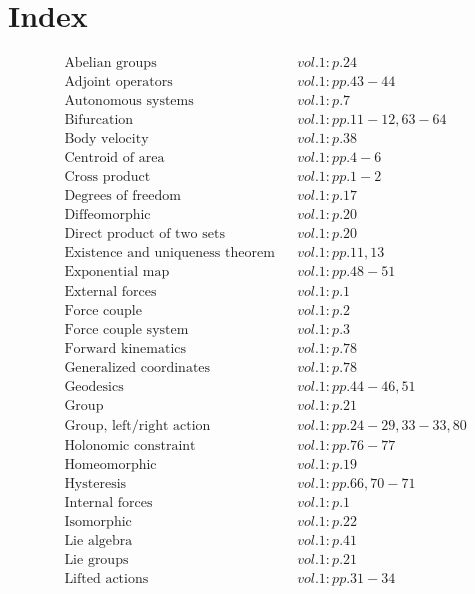 \documentclass[a4paper]{article}
\begin{document}
 
\section*{Index} 
\allowdisplaybreaks 
\begin{align*} 
&\text{Abelian groups} && vol. 1: p. 24\\
&\text{Adjoint operators} && vol. 1: pp. 43-44\\
&\text{Autonomous systems} && vol. 1: p. 7\\
&\text{Bifurcation} && vol. 1: pp. 11-12, 63-64\\
&\text{Body velocity} && vol. 1: p. 38\\
&\text{Centroid of area} && vol. 1: pp. 4-6\\
&\text{Cross product} && vol. 1: pp. 1-2\\
&\text{Degrees of freedom} && vol. 1: p. 17\\
&\text{Diffeomorphic} && vol. 1: p. 20\\
&\text{Direct product of two sets} && vol. 1: p. 20\\
&\text{Existence and uniqueness theorem} && vol. 1: pp. 11, 13\\
&\text{Exponential map} && vol. 1: pp. 48-51\\
&\text{External forces} && vol. 1: p. 1\\
&\text{Force couple} && vol. 1: p. 2\\
&\text{Force couple system} && vol. 1: p. 3\\
&\text{Forward kinematics} && vol. 1: p. 78\\
&\text{Generalized coordinates} && vol. 1: p. 78\\
&\text{Geodesics} && vol. 1: pp. 44-46, 51\\
&\text{Group} && vol. 1: p. 21\\
&\text{Group, left/right action} && vol. 1: pp. 24-29, 33-33, 80\\
&\text{Holonomic constraint} && vol. 1: pp. 76-77\\
&\text{Homeomorphic} && vol. 1: p. 19\\
&\text{Hysteresis} && vol. 1: pp. 66, 70-71\\
&\text{Internal forces} && vol. 1: p. 1\\
&\text{Isomorphic} && vol. 1: p. 22\\
&\text{Lie algebra} && vol. 1: p. 41\\
&\text{Lie groups} && vol. 1: p. 21\\
&\text{Lifted actions} && vol. 1: pp. 31-34\\

\end{align*}
\end{document}

